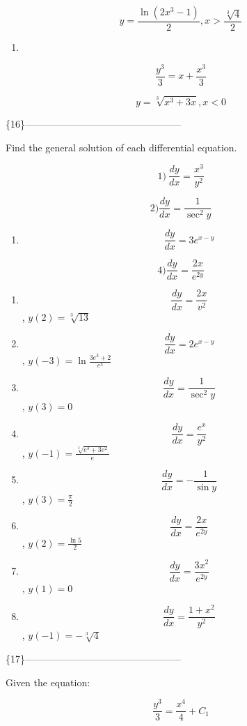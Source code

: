 \documentclass[
]{article}
\providecommand{\tightlist}{%
  \setlength{\itemsep}{0pt}\setlength{\parskip}{0pt}}
\begin{document}
\[y = \frac{\ln(2x^3 - 1)}{2}, x > \frac{\sqrt[3]{4}}{2}\]

\begin{enumerate}
\def\labelenumi{\arabic{enumi})}
\setcounter{enumi}{11}
\tightlist
\item
\end{enumerate}

\[\frac{y^3}{3} = x + \frac{x^3}{3}\]

\[y = \sqrt[3]{x^3 + 3x}, x < 0\]

\{16\}------------------------------------------------

Find the general solution of each differential equation.

\[1) \ \frac{dy}{dx} = \frac{x^3}{y^2}\]

\[2) \frac{dy}{dx} = \frac{1}{\sec^2 y}\]

\begin{enumerate}
\def\labelenumi{\arabic{enumi})}
\setcounter{enumi}{2}
\tightlist
\item
  \[\frac{dy}{dx} = 3e^{x-y}\]
\end{enumerate}

\[4) \frac{dy}{dx} = \frac{2x}{e^{2y}}\]

\begin{enumerate}
\def\labelenumi{\arabic{enumi})}
\setcounter{enumi}{4}
\item
  \[\frac{dy}{dx} = \frac{2x}{v^2}\] , \(y(2) = \sqrt[3]{13}\)
\item
  \[\frac{dy}{dx} = 2e^{x-y}\] , \(y(-3) = \ln \frac{3e^3 + 2}{e^3}\)
\item
  \[\frac{dy}{dx} = \frac{1}{\sec^2 y}\] , \(y(3) = 0\)
\item
  \[\frac{dy}{dx} = \frac{e^x}{y^2}\] ,
  \(y(-1) = \frac{\sqrt[3]{e^3 + 3e^2}}{e}\)
\item
  \[\frac{dy}{dx} = -\frac{1}{\sin y}\] , \(y(3) = \frac{\pi}{2}\)
\item
  \[\frac{dy}{dx} = \frac{2x}{e^{2y}}\] , \(y(2) = \frac{\ln 5}{2}\)
\item
  \[\frac{dy}{dx} = \frac{3x^2}{e^{2y}}\] , \(y(1) = 0\)
\item
  \[\frac{dy}{dx} = \frac{1+x^2}{y^2}\] , \(y(-1) = -\sqrt[3]{4}\)
\end{enumerate}

\{17\}------------------------------------------------

Given the equation:

\[\frac{y^3}{3} = \frac{x^4}{4} + C_1\]
\end{document}
